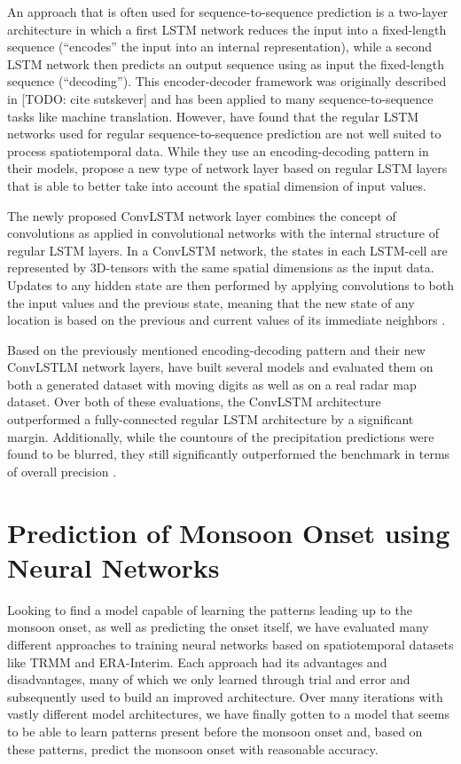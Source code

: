 An approach that is often used for sequence-to-sequence prediction is a two-layer architecture in which a first LSTM network reduces the input into a fixed-length sequence (``encodes'' the input into an internal representation), while a second LSTM network then predicts an output sequence using as input the fixed-length sequence (``decoding''). This encoder-decoder framework was originally described in [TODO: cite sutskever] and has been applied to many sequence-to-sequence tasks like machine translation. However, \citet{Shi.2015} have found that the regular LSTM networks used for regular sequence-to-sequence prediction are not well suited to process spatiotemporal data. While they use an encoding-decoding pattern in their models, \citet{Shi.2015} propose a new type of network layer based on regular LSTM layers that is able to better take into account the spatial dimension of input values.

The newly proposed ConvLSTM network layer combines the concept of convolutions as applied in convolutional networks with the internal structure of regular LSTM layers. In a ConvLSTM network, the states in each LSTM-cell are represented by 3D-tensors with the same spatial dimensions as the input data. Updates to any hidden state are then performed by applying convolutions to both the input values and the previous state, meaning that the new state of any location is based on the previous and current values of its immediate neighbors \citep{Shi.2015}.

Based on the previously mentioned encoding-decoding pattern and their new ConvLSTLM network layers, \citet{Shi.2015} have built several models and evaluated them on both a generated dataset with moving digits as well as on a real radar map dataset. Over both of these evaluations, the ConvLSTM architecture outperformed a fully-connected regular LSTM architecture by a significant margin. Additionally, while the countours of the precipitation predictions were found to be blurred, they still significantly outperformed the benchmark in terms of overall precision \citep{Shi.2015}.

\newpage
\section{Prediction of Monsoon Onset using Neural Networks}
\label{st:nn_implementation}
Looking to find a model capable of learning the patterns leading up to the monsoon onset, as well as predicting the onset itself, we have evaluated many different approaches to training neural networks based on spatiotemporal datasets like TRMM and ERA-Interim. Each approach had its advantages and disadvantages, many of which we only learned through trial and error and subsequently used to build an improved architecture. Over many iterations with vastly different model architectures, we have finally gotten to a model that seems to be able to learn patterns present before the monsoon onset and, based on these patterns, predict the monsoon onset with reasonable accuracy.


